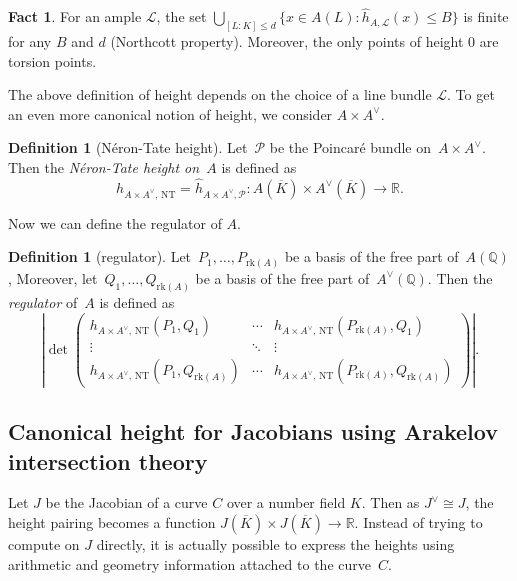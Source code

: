 \documentclass[12pt]{article}
\theoremstyle{definition}
\newtheorem{definition}[theorem]{Definition}
\newtheorem{fact}[theorem]{Fact}
\numberwithin{equation}{subsection}
\newcommand{\R}{\ensuremath{\mathbb{R}}}
\newcommand{\Q}{\ensuremath{\mathbb{Q}}}
\begin{document}
\begin{fact}
For an ample $\mathcal{L}$, the set $\bigcup_{[L:K] \leq d} \{ x \in A(L) : \widehat{h}_{A,\mathcal{L}}(x) \leq B\}$ is finite for any $B$ and $d$ (Northcott property). Moreover, the only points of height 0 are torsion points.
\end{fact}

The above definition of height depends on the choice of a line bundle $\mathcal{L}$. To get an even more canonical notion of height, we consider $A \times A^\vee$.

\begin{definition}[N\'eron-Tate height]
Let~$\mathcal{P}$ be the Poincar\'e bundle on~$A \times A^{\vee}$. Then the {\em N\'eron-Tate height on~$A$} is defined as
$$h_{A \times A^{\vee},\, \textrm{NT}} = \widehat{h}_{A \times A^{\vee}, \mathcal{P}}  : A(\overline{K}) \times A^{\vee}(\overline{K}) \rightarrow \R.$$
\end{definition}

Now we can define the regulator of $A$.

\begin{definition}[regulator]
Let~$P_1, \ldots, P_{\mathrm{rk}(A)}$ be a basis of the free part of~$A(\Q)$, Moreover, let~$Q_1, \ldots, Q_{\mathrm{rk}(A)}$ be a basis of the free part of~$A^\vee(\Q)$. Then the {\em regulator} of~$A$ is defined as
$$\left|\det\!\begin{pmatrix}
h_{A \times A^{\vee},\, \textrm{NT}}(P_1, Q_1)   &\cdots     &h_{A \times A^{\vee},\, \textrm{NT}}(P_{\mathrm{rk}(A)}, Q_1)\\
\vdots  &\ddots     &\vdots \\
h_{A \times A^{\vee},\, \textrm{NT}}(P_1, Q_{\mathrm{rk}(A)})   &\cdots     &h_{A \times A^{\vee},\, \textrm{NT}}(P_{\mathrm{rk}(A)}, Q_{\mathrm{rk}(A)})
\end{pmatrix}\right|.$$
\end{definition}

\subsection{Canonical height for Jacobians using Arakelov intersection theory}

Let $J$ be the Jacobian of a curve $C$ over a number field $K$.
Then as $J^\vee \cong J$, the height pairing becomes a function $J(\overline{K}) \times J(\overline{K}) \to \R$.
Instead of trying to compute on $J$ directly, it is actually possible to express the heights using arithmetic and geometry information attached to the curve~$C$.
\end{document}
